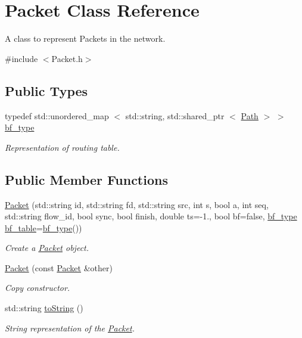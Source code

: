 \hypertarget{classPacket}{\section{\-Packet \-Class \-Reference}
\label{classPacket}
}


\-A class to represent \-Packets in the network.  




{\ttfamily \#include $<$\-Packet.\-h$>$}

\subsection*{\-Public \-Types}
\begin{DoxyCompactItemize}
\item 
typedef std\-::unordered\-\_\-map\*
$<$ std\-::string, std\-::shared\-\_\-ptr\*
$<$ \hyperlink{classPath}{\-Path} $>$ $>$ \hyperlink{classPacket_a4cae1612a245ea2eadde0066ecc4b990}{bf\-\_\-type}
\begin{DoxyCompactList}\small\item\em \-Representation of routing table. \end{DoxyCompactList}\end{DoxyCompactItemize}
\subsection*{\-Public \-Member \-Functions}
\begin{DoxyCompactItemize}
\item 
\hyperlink{classPacket_a0467ca3fb88b9a8a6a41182aed61e5b3}{\-Packet} (std\-::string id, std\-::string fd, std\-::string src, int s, bool a, int seq, std\-::string flow\-\_\-id, bool sync, bool finish, double ts=-\/1., bool bf=false, \hyperlink{classPacket_a4cae1612a245ea2eadde0066ecc4b990}{bf\-\_\-type} \hyperlink{classPacket_ad19b836a6a6deab55ec66cb333642a5e}{bf\-\_\-table}=\hyperlink{classPacket_a4cae1612a245ea2eadde0066ecc4b990}{bf\-\_\-type}())
\begin{DoxyCompactList}\small\item\em \-Create a \hyperlink{classPacket}{\-Packet} object. \end{DoxyCompactList}\item 
\hyperlink{classPacket_ae8d5dfea51fa7fe55e4705b176f326ec}{\-Packet} (const \hyperlink{classPacket}{\-Packet} \&other)
\begin{DoxyCompactList}\small\item\em \-Copy constructor. \end{DoxyCompactList}\item 
std\-::string \hyperlink{classPacket_aa4f4ad4075cad5a29af1646c3e289399}{to\-String} ()
\begin{DoxyCompactList}\small\item\em \-String representation of the \hyperlink{classPacket}{\-Packet}. \end{DoxyCompactList}\end{DoxyCompactItemize}
